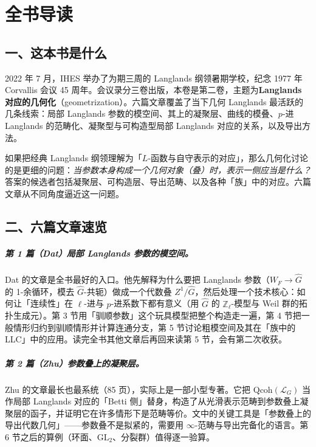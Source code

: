 \chapter*{全书导读}

\section*{一、这本书是什么}

2022 年 7 月，IHES 举办了为期三周的 Langlands 纲领暑期学校，纪念 1977 年 Corvallis 会议 45 周年。会议录分三卷出版，本卷是第二卷，主题为\textbf{Langlands 对应的几何化}（geometrization）。六篇文章覆盖了当下几何 Langlands 最活跃的几条线索：局部 Langlands 参数的模空间、其上的凝聚层、曲线的模叠、$p$-进 Langlands 的范畴化、凝聚型与可构造型局部 Langlands 对应的关系，以及导出方法。

如果把经典 Langlands 纲领理解为「$L$-函数与自守表示的对应」，那么几何化讨论的是更细的问题：\emph{当参数本身构成一个几何对象（叠）时，表示一侧应当是什么？}答案的候选者包括凝聚层、可构造层、导出范畴、以及各种「族」中的对应。六篇文章从不同角度逼近这一问题。

\section*{二、六篇文章速览}

\paragraph{第 1 篇（Dat）局部 Langlands 参数的模空间。}
Dat 的文章是全书最好的入口。他先解释为什么要把 Langlands 参数（$W_F \to \hat G$ 的 1-余循环，模去 $\hat G$-共轭）做成一个代数叠 $Z^1/\hat G$，然后处理一个技术核心：如何让「连续性」在 $\ell$-进与 $p$-进系数下都有意义（用 $\hat G$ 的 $\mathbb Z_\ell$-模型与 Weil 群的拓扑生成元）。第 3 节用「驯顺参数」这个玩具模型把整个构造走一遍，第 4 节把一般情形归约到驯顺情形并计算连通分支，第 5 节讨论粗模空间及其在「族中的 LLC」中的应用。读完全书其他文章后再回来读第 5 节，会有第二次收获。

\paragraph{第 2 篇（Zhu）参数叠上的凝聚层。}
Zhu 的文章最长也最系统（85 页），实际上是一部小型专著。它把 $\mathrm{Qcoh}(\mathcal L_G)$ 当作局部 Langlands 对应的「Betti 侧」替身，构造了从光滑表示范畴到参数叠上凝聚层的函子，并证明它在许多情形下是范畴等价。文中的关键工具是「参数叠上的导出代数几何」——参数叠不是拟紧的，需要用 $\infty$-范畴与导出完备化的语言。第 6 节之后的算例（环面、$\mathrm{GL}_2$、分裂群）值得逐一验算。

